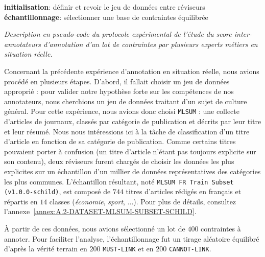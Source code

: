 			\begin{algorithm}
				\textbf{initialisation}: définir et revoir le jeu de données entre réviseurs \;
				\textbf{échantillonnage}: sélectionner une base de contraintes équilibrée \;
				\caption{\textit{
					Description en pseudo-code du protocole expérimental de l'étude du score inter-annotateurs d'annotation d'un lot de contraintes par plusieurs experts métiers en situation réelle.
				}}
				\label{algorithm:4.6.3-ETUDE-ROBUSTESSE-SCORE-INTER-ANNOTATEURS-PROTOCOLE}
			\end{algorithm}
			
			Concernant la précédente expérience d'annotation en situation réelle, nous avions procédé en plusieurs étapes.
			D'abord, il fallait choisir un jeu de données approprié : pour valider notre hypothèse forte sur les compétences de nos annotateurs, nous cherchions un jeu de données traitant d'un sujet de culture général.
			Pour cette expérience, nous avions donc choisi \texttt{MLSUM} : une collecte d'articles de journaux, classés par catégorie de publication et décrits par leur titre et leur résumé.
			Nous nous intéressions ici à la tâche de classification d'un titre d'article en fonction de sa catégorie de publication.
			Comme certains titres pouvaient porter à confusion (un titre d'article n'étant pas toujours explicite sur son contenu), deux réviseurs furent chargés de choisir les données les plus explicites sur un échantillon d'un millier de données représentatives des catégories les plus communes.
			L'échantillon résultant, noté \texttt{MLSUM FR Train Subset (v1.0.0-schild)}, est composé de $744$ titres d'articles rédigés en français et répartis en $14$ classes (\textit{économie}, \textit{sport}, ...).
			Pour plus de détails, consultez l'annexe~\ref{annex:A.2-DATASET-MLSUM-SUBSET-SCHILD}.
		
			À partir de ces données, nous avions sélectionné un lot de $400$ contraintes à annoter.
			Pour faciliter l'analyse, l'échantillonnage fut un tirage aléatoire équilibré d'après la vérité terrain en $200$ \texttt{MUST-LINK} et en $200$ \texttt{CANNOT-LINK}.
			
